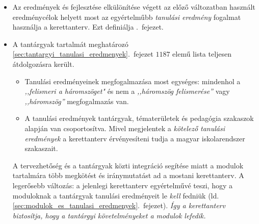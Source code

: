 \begin{itemize}
      \item  Az eredmények és fejlesztése elkülönítése végett az előző
            változatban használt
            eredménycélok helyett most az egyértelműbb \emph{tanulási eredmény}
            fogalmat
            használja a kerettanterv. Ezt definiálja
            .~fejezet.

      \item A tantárgyak tartalmát meghatározó
            \ref{sec:tantargyi_tanulasi_eredmenyek}.~fejezet $1187$ elemű
            lista teljesen
            átdolgozásra került.
            \begin{itemize}
                  \item Tanulási eredményeinek megfogalmazása most egységes:
                        mindenhol a
                        \emph{,,felismeri a háromszöget"}
                        és nem a \emph{,,háromszög felismerése''} vagy
                        \emph{,,háromszög''}
                        megfogalmazás van.
                  \item A tanulási eredmények tantárgyak,
                        tématerületek és
                        pedagógia szakaszok alapján van csoportosítva. Mivel
                        megjelentek a \emph{kötelező tanulási
                              eredmények} a
                        kerettanterv érvényesíteni tudja a magyar iskolarendszer
                        szakaszait.
            \end{itemize}
            A tervezhetőség és a tantárgyak
            közti integráció segítése miatt a modulok tartalmára több megkötést és iránymutatást ad a mostani
            kerettanterv. A legerősebb változás: a jelenlegi kerettanterv
            egyértelművé teszi, hogy a moduloknak a tantárgyak tanulási
            eredményeit le \emph{kell} fedniük (ld.
            \ref{sec:modulok_es_tanulasi_eredmenyek}.~fejezet).
            \emph{Így a kerettanterv biztosítja, hogy a tantárgyi követelményeket
                  a modulok lefedik.}


\end{itemize}
